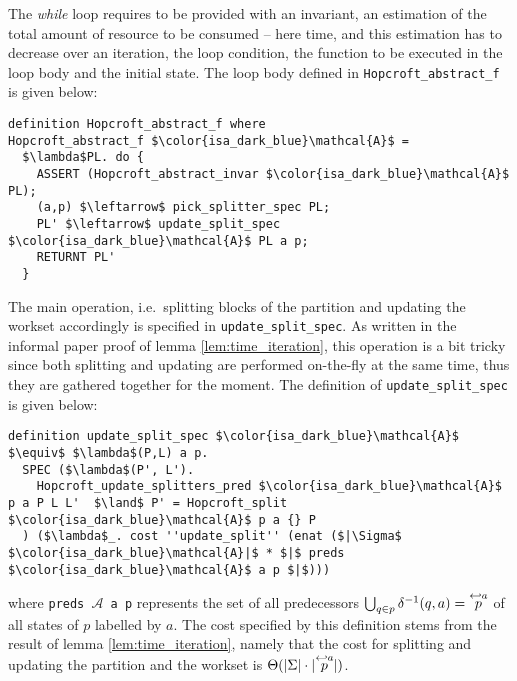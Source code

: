 \documentclass[12pt, a4 paper]{article}
\theoremstyle{definition}
\begin{document}
The \textit{while} loop requires to be provided with an invariant, an estimation of the total amount of resource to be consumed -- here time, and this estimation has to decrease over an iteration, the loop condition, the function to be executed in the loop body and the initial state.
The loop body defined in \texttt{Hopcroft\_abstract\_f} is given below:

\noindent
\begin{minipage}{\linewidth}
\begin{lstlisting}[language=Isabelle]
definition Hopcroft_abstract_f where
Hopcroft_abstract_f $\color{isa_dark_blue}\mathcal{A}$ = 
  $\lambda$PL. do {
    ASSERT (Hopcroft_abstract_invar $\color{isa_dark_blue}\mathcal{A}$ PL);                             
    (a,p) $\leftarrow$ pick_splitter_spec PL;
    PL' $\leftarrow$ update_split_spec $\color{isa_dark_blue}\mathcal{A}$ PL a p;
    RETURNT PL'
  }
\end{lstlisting}
\end{minipage}

The main operation, i.e.\ splitting blocks of the partition and updating the workset accordingly is specified in \texttt{update\_split\_spec}.
As written in the informal paper proof of lemma \ref{lem:time_iteration}, this operation is a bit tricky since both splitting and updating are performed on-the-fly at the same time, thus they are gathered together for the moment.
The definition of \texttt{update\_split\_spec} is given below:

\begin{lstlisting}[language=Isabelle]
definition update_split_spec $\color{isa_dark_blue}\mathcal{A}$ $\equiv$ $\lambda$(P,L) a p.
  SPEC ($\lambda$(P', L').
    Hopcroft_update_splitters_pred $\color{isa_dark_blue}\mathcal{A}$ p a P L L'  $\land$ P' = Hopcroft_split $\color{isa_dark_blue}\mathcal{A}$ p a {} P
  ) ($\lambda$_. cost ''update_split'' (enat ($|\Sigma$ $\color{isa_dark_blue}\mathcal{A}|$ * $|$ preds $\color{isa_dark_blue}\mathcal{A}$ a p $|$)))
\end{lstlisting}
where \texttt{preds $\mathcal{A}$ a p} represents the set of all predecessors $\bigcup_{q \in p} \delta^{-1}(q, a) = \overset{\hookleftarrow {a}}{p}$ of all states of $p$ labelled by $a$. The cost specified by this definition stems from the result of lemma \ref{lem:time_iteration}, namely that the cost for splitting and updating the partition and the workset is $\Theta(|\Sigma| \cdot |\overset{\hookleftarrow {a}}{p}|)$.

\bigskip
\end{document}
